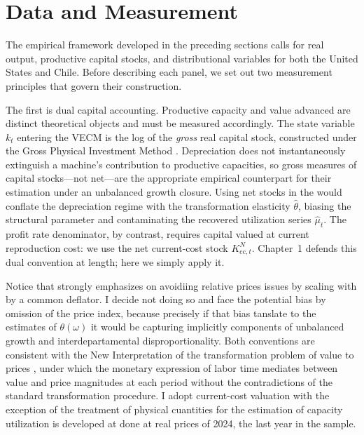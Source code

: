 \documentclass[11pt,a4paper]{article}
\begin{document}
{%

\section{Data and Measurement}
\label{sec:data}

The empirical framework developed in the preceding sections calls for real output, productive capital stocks, and distributional variables for both the United States and Chile. Before describing each panel, we set out two measurement principles that govern their construction.

The first is dual capital accounting. Productive capacity and value advanced are distinct theoretical objects and must be measured accordingly. The state variable $k_t$ entering the VECM is the log of the \emph{gross} real capital stock, constructed under the Gross Physical Investment Method \cite[Appendix on Ch.~6]{Shaikh2016}. Depreciation does not instantaneously extinguish a machine's contribution to productive capacities, so gross measures of capital stocks---not net---are the appropriate empirical counterpart for their estimation under an unbalanced growth closure. Using net stocks in the would conflate the depreciation regime with the transformation elasticity $\hat{\theta}$, biasing the structural parameter and contaminating the recovered utilization series $\hat{\mu}_t$. The profit rate denominator, by contrast, requires capital valued at current reproduction cost: we use the net current-cost stock $K^N_{\text{cc},t}$. Chapter~1 defends this dual convention at length; here we simply apply it.

Notice that \citet{Shaikh2016} strongly emphasizes on avoidiing relative prices issues by scaling with by a common deflator. I decide not doing so and face the potential bias by omission of the price index, because precisely if that bias tanslate to the estimates of $\theta(\omega)$  it would be capturing implicitly components of unbalanced growth and interdepartamental disproportionality. Both conventions are consistent with the New Interpretation of the transformation problem of value to prices \citep{Foley1982,Basu2022}, under which the monetary expression of labor time mediates between value and price magnitudes at each period without the contradictions of the standard transformation procedure. I adopt current-cost valuation with the exception of the treatment of physical cuantities for the estimation of capacity utilization is developed at done at real prices of 2024, the last year in the sample. 

}
\end{document}
